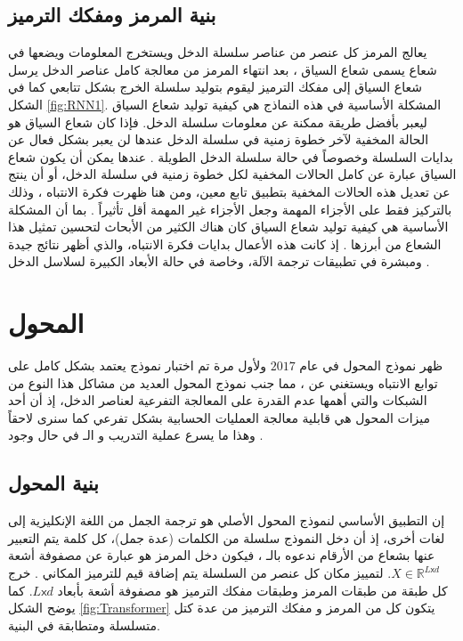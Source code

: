 \subsection{
بنية المرمز ومفكك الترميز
}
يعالج المرمز كل عنصر من عناصر سلسلة الدخل ويستخرج المعلومات ويضعها في شعاع يسمى شعاع السياق
،
بعد انتهاء المرمز من معالجة كامل عناصر الدخل يرسل شعاع السياق إلى مفكك الترميز
 ليقوم بتوليد سلسلة الخرج بشكل تتابعي كما في الشكل
\ref{fig:RNN1}.
\newline
المشكلة الأساسية في هذه النماذج هي كيفية توليد شعاع السياق ليعبر بأفضل طريقة ممكنة عن معلومات سلسلة الدخل. فإذا كان شعاع السياق هو الحالة المخفية لآخر خطوة زمنية في سلسلة الدخل عندها لن يعبر بشكل فعال عن بدايات السلسلة وخصوصاً في حالة سلسلة الدخل الطويلة
.
عندها يمكن أن يكون شعاع السياق عبارة عن كامل الحالات المخفية لكل خطوة زمنية في سلسلة الدخل، أو أن ينتج عن تعديل هذه الحالات المخفية بتطبيق تابع معين، ومن هنا ظهرت فكرة الانتباه 
،
وذلك بالتركيز فقط على الأجزاء المهمة وجعل الأجزاء غير المهمة أقل تأثيراً
.
بما أن المشكلة الأساسية هي كيفية توليد شعاع السياق كان هناك الكثير من الأبحاث لتحسين تمثيل هذا الشعاع من أبرزها
.
إذ كانت هذه الأعمال بدايات فكرة الانتباه، والذي أظهر نتائج جيدة ومبشرة في تطبيقات ترجمة الآلة، وخاصة في حالة الأبعاد الكبيرة لسلاسل الدخل
.

\section{المحول \label{section:transformer}}
ظهر نموذج المحول
في عام $2017$ ولأول مرة تم اختبار نموذج يعتمد بشكل كامل على توابع الانتباه ويستغني عن
،
 مما جنب نموذج المحول العديد من مشاكل هذا النوع من الشبكات والتي أهمها عدم القدرة على المعالجة التفرعية لعناصر الدخل، إذ أن أحد ميزات المحول هي قابلية معالجة العمليات الحسابية بشكل تفرعي كما سنرى لاحقاً وهذا ما يسرع عملية التدريب و الـ 
في حال وجود
.
\subsection{بنية المحول}
          
إن التطبيق الأساسي لنموذج المحول الأصلي
هو ترجمة الجمل من اللغة الإنكليزية إلى لغات أخرى، إذ أن دخل النموذج سلسلة من الكلمات (عدة جمل)، كل كلمة يتم التعبير عنها بشعاع من الأرقام ندعوه بالـ
،
فيكون دخل المرمز هو عبارة عن مصفوفة أشعة
$X \in \mathds{R}^{L \mathsf{x}d}$.
\newline
لتمييز مكان كل عنصر من السلسلة  يتم إضافة قيم للترميز المكاني
.
خرج كل طبقة من طبقات المرمز وطبقات مفكك الترميز
هو مصفوفة أشعة بأبعاد
$L \mathsf{x} d$.
كما يوضح الشكل
\ref{fig:Transformer}
يتكون كل من المرمز و مفكك الترميز
 من عدة كتل متسلسلة ومتطابقة في البنية.
